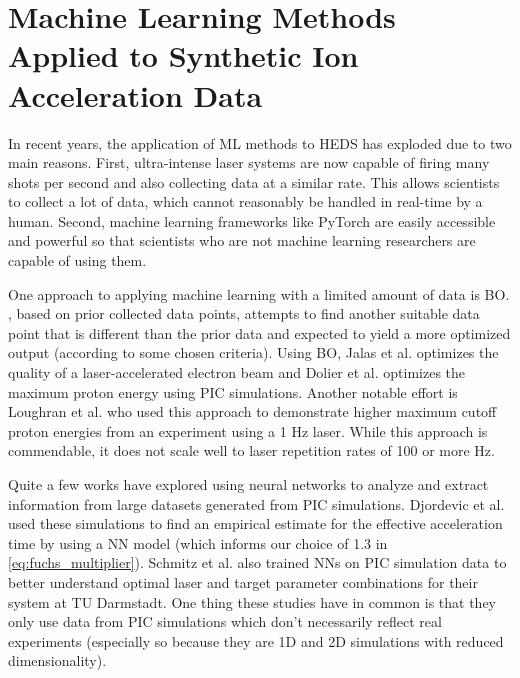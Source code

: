 \chapter{Machine Learning Methods Applied to Synthetic Ion Acceleration Data} \label{ch:5}

In recent years, the application of \gls{ML} methods to \gls{HEDS} has exploded due to two main reasons. First, ultra-intense laser systems are now capable of firing many shots per second and also collecting data at a similar rate. This allows scientists to collect a lot of data, which cannot reasonably be handled in real-time by a human. Second, machine learning frameworks like PyTorch \cite{PyTorch_2019} are easily accessible and powerful so that scientists who are not machine learning researchers are capable of using them.

One approach to applying machine learning with a limited amount of data is \gls{BO}. , based on prior collected data points, attempts to find another suitable data point that is different than the prior data and expected to yield a more optimized output (according to some chosen criteria). Using \gls{BO}, Jalas et al. \cite{Jalas_2021_PRL} optimizes the quality of a laser-accelerated electron beam and Dolier et al. \cite{Dolier_2022_NJoP} optimizes the maximum proton energy using PIC simulations. Another notable effort is Loughran et al. \cite{Loughran_2023_HPLSE} who used this approach to demonstrate higher maximum cutoff proton energies from an experiment using a 1 Hz laser. While this approach is commendable, it does not scale well to laser repetition rates of 100 or more Hz. 

Quite a few works have explored using neural networks to analyze and extract information from large datasets generated from \gls{PIC} simulations. Djordevic et al. \cite{Djordjevic_2021_PPCF} used these simulations to find an empirical estimate for the effective acceleration time by using a \gls{NN} model (which informs our choice of 1.3 in \autoref{eq:fuchs_multiplier}). Schmitz et al. \cite{Schmitz_2023_LaPB} also trained \gls{NN}s on \gls{PIC} simulation data to better understand optimal laser and target parameter combinations for their system at TU Darmstadt. One thing these studies have in common is that they only use data from \gls{PIC} simulations which don't necessarily reflect real experiments (especially so because they are 1D and 2D simulations with reduced dimensionality). 

